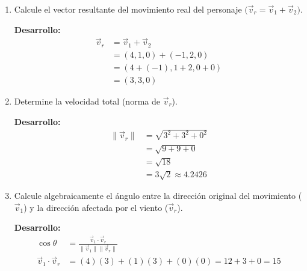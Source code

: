 \documentclass{article}
\begin{document}
\begin{enumerate}[label=\textbf{\arabic*.}, itemsep=0.8em, leftmargin=2em]
  \item Calcule el vector resultante del movimiento real del personaje $\big(\vec v_r = \vec v_1 + \vec v_2\big)$.
  \begin{center}
  \colorbox{blue!5}{\begin{minipage}{0.9\textwidth}
    	\vspace{0.2cm}
    		\textbf{Desarrollo:}
    	\vspace{0.2cm}
  \begin{align*}
  \vec v_r &= \vec v_1 + \vec v_2 \\
       &= (4,1,0) + (-1,2,0) \\
       &= (4+(-1), 1+2, 0+0) \\
       &= (3,3,0)
  \end{align*}
  \end{minipage}}
  \end{center}
  \item Determine la velocidad total (norma de $\vec v_r$).
  \begin{center}
  \colorbox{green!5}{\begin{minipage}{0.9\textwidth}
    	\vspace{0.2cm}
    		\textbf{Desarrollo:}
    	\vspace{0.2cm}
  \begin{align*}
  \|\vec v_r\| &= \sqrt{3^2 + 3^2 + 0^2} \\
         &= \sqrt{9 + 9 + 0} \\
         &= \sqrt{18} \\
         &= 3\sqrt{2} \approx 4.2426
  \end{align*}
  \end{minipage}}
  \end{center}
    \item Calcule algebraicamente el ángulo entre la dirección original del movimiento ($\vec v_1$) y la dirección afectada por el viento ($\vec v_r$).
    \begin{center}
    \colorbox{red!5}{\begin{minipage}{0.9\textwidth}
    \vspace{0.2cm}
    	\textbf{Desarrollo:}
    \vspace{0.2cm}
    \begin{align*}
    \cos \theta &= \frac{\vec v_1 \cdot \vec v_r}{\|\vec v_1\| \|\vec v_r\|} \\
    \vec v_1 \cdot \vec v_r &= (4)(3) + (1)(3) + (0)(0) = 12 + 3 + 0 = 15 \\

\end{align*}
\end{minipage}}
\end{center}
\end{enumerate}
\end{document}
